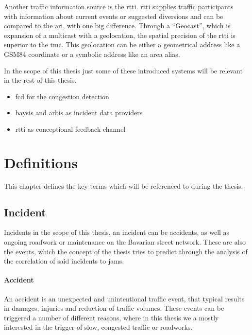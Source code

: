 \documentclass[a4paper,12pt]{report}
\begin{document}
\par Another traffic information source is the \acrfull{rtti}. \acrshort{rtti} supplies traffic participants with information about current events or suggested diversions and can be compared to the \acrfull{ari}, with one big difference. Through a “Geocast”, which is expansion of a multicast with a geolocation, the spatial precision of the \acrshort{rtti} is superior to the \acrshort{tmc}. This geolocation can be either a geometrical address like a GSM84 coordinate or a symbolic address like an area alias. \cite{LAPID2020,HindenDeering2006,ImielinskiNavas1996} \newline


\par In the scope of this thesis just some of these introduced systems will be relevant in the rest of this thesis. 
\begin{itemize}
  \item \acrshort{fcd} for the congestion detection
  \item \acrshort{baysis} and \acrshort{arbis} as incident data providers
  \item \acrshort{rtti} as conceptional feedback channel
\end{itemize}

\chapter{Definitions}
	This chapter defines the key terms which will be referenced to during the thesis.
\section{Incident}
		Incidents in the scope of this thesis, an incident can be accidents, as well as ongoing roadwork or maintenance on the Bavarian street network. These are also the events, which the concept of the thesis tries to predict through the analysis of the correlation of said incidents to jams.
	\subsubsection{Accident}
		An accident is an unexpected and unintentional traffic event, that typical results in damages, injuries and reduction of traffic volumes. These events can be triggered a number of different reasons, where in this thesis we a mostly interested in the trigger of slow, congested traffic or roadworks.
\end{document}
